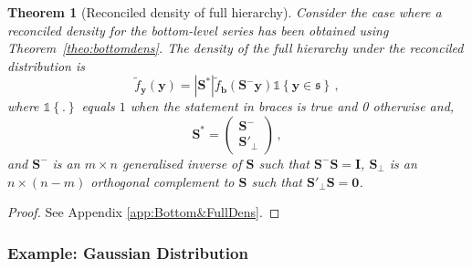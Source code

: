 \documentclass[12pt]{article}
\newtheorem{theo}{Theorem}[section]
\theoremstyle{definition}
\begin{document}
\begin{theo}[Reconciled density of full hierarchy]\label{theo:fulldens}
	Consider the case where a reconciled density for the bottom-level series has been obtained using Theorem~\ref{theo:bottomdens}.  The density of the full hierarchy under the reconciled distribution is
	\[
	\tilde{f}_{\bm{y}}(\bm{y})=|\bm{S^*}|\tilde{f}_{\bm b}({\bm{S^-}\bm{y}})\mathbb{1}\left\{\bm{y}\in\mathfrak{s}\right\}\,,
	\]
	where $\mathbb{1}\left\{.\right\}$ equals $1$ when the statement in braces is true and 0 otherwise and,
	\[\bm{S^*}=\begin{pmatrix}\bm{S}^-\\\bm{S}'_\perp\end{pmatrix}\,,\]
	and $\bm{S^-}$ is an $m\times n$ generalised inverse of $\bm{S}$ such that $\bm{S}^-\bm{S}=\bm{I}$, $\bm{S_\perp}$ is an $n\times (n-m)$ orthogonal complement to $\bm{S}$ such that $\bm{S}'_\perp\bm{S}=\bm{0}$.
\end{theo}

\begin{proof}
	See Appendix \ref{app:Bottom&FullDens}.
\end{proof}

\subsubsection*{Example: Gaussian Distribution}
\end{document}
